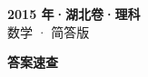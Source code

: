 \documentclass[zihao=-4, a4paper]{ctexart}
\begin{document}
\begin{center}
  {\Large\bfseries 2015 年·湖北卷·理科}\\[4pt]
  {\large 数学 · 简答版}
\end{center}
\medskip
{}

\clearpage
{}
\begin{center}{\Large\bfseries 答案速查}\end{center}
\medskip

\end{document}
